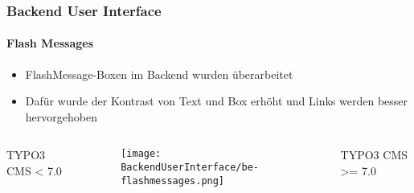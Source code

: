 
\begin{frame}[fragile]
	\frametitle{Backend User Interface}
	\framesubtitle{Flash Messages}

	\begin{itemize}
		\item FlashMessage-Boxen im Backend wurden überarbeitet
		\item Dafür wurde der Kontrast von Text und Box erhöht und Links werden besser hervorgehoben
	\end{itemize}

	\begin{columns}[T]
		\begin{column}{.25\textwidth}
			\smaller\hfill
				\begingroup\color{typo3red}TYPO3 CMS < 7.0\endgroup
			\normalsize
		\end{column}

		\begin{column}{.5\textwidth}
			\begin{figure}\vspace*{-0.6cm}
				\texttt{[image: BackendUserInterface/be-flashmessages.png]}
			\end{figure}
		\end{column}

		\begin{column}{.25\textwidth}
			\smaller
				\begingroup\color{typo3red}TYPO3 CMS >= 7.0\endgroup
			\normalsize
		\end{column}
	\end{columns}

\end{frame}


